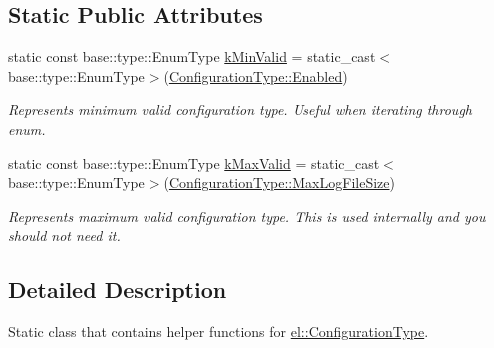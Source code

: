 \subsection*{Static Public Attributes}
\begin{DoxyCompactItemize}
\item 
\hypertarget{classel_1_1ConfigurationTypeHelper_ab7266e698eb32dec2da285325a66e322}{static const base\-::type\-::\-Enum\-Type \hyperlink{classel_1_1ConfigurationTypeHelper_ab7266e698eb32dec2da285325a66e322}{k\-Min\-Valid} = static\-\_\-cast$<$base\-::type\-::\-Enum\-Type$>$(\hyperlink{namespaceel_a281f5db6d6163678bc68a8b23b59e124a00d23a76e43b46dae9ec7aa9dcbebb32}{Configuration\-Type\-::\-Enabled})}\label{classel_1_1ConfigurationTypeHelper_ab7266e698eb32dec2da285325a66e322}

\begin{DoxyCompactList}\small\item\em Represents minimum valid configuration type. Useful when iterating through enum. \end{DoxyCompactList}\item 
\hypertarget{classel_1_1ConfigurationTypeHelper_aa02f3cefb127e7eb97d7e1dd7f51a12d}{static const base\-::type\-::\-Enum\-Type \hyperlink{classel_1_1ConfigurationTypeHelper_aa02f3cefb127e7eb97d7e1dd7f51a12d}{k\-Max\-Valid} = static\-\_\-cast$<$base\-::type\-::\-Enum\-Type$>$(\hyperlink{namespaceel_a281f5db6d6163678bc68a8b23b59e124a4b35e615142d60db6383426f051e700b}{Configuration\-Type\-::\-Max\-Log\-File\-Size})}\label{classel_1_1ConfigurationTypeHelper_aa02f3cefb127e7eb97d7e1dd7f51a12d}

\begin{DoxyCompactList}\small\item\em Represents maximum valid configuration type. This is used internally and you should not need it. \end{DoxyCompactList}\end{DoxyCompactItemize}


\subsection{Detailed Description}
Static class that contains helper functions for \hyperlink{namespaceel_a281f5db6d6163678bc68a8b23b59e124}{el\-::\-Configuration\-Type}. 


